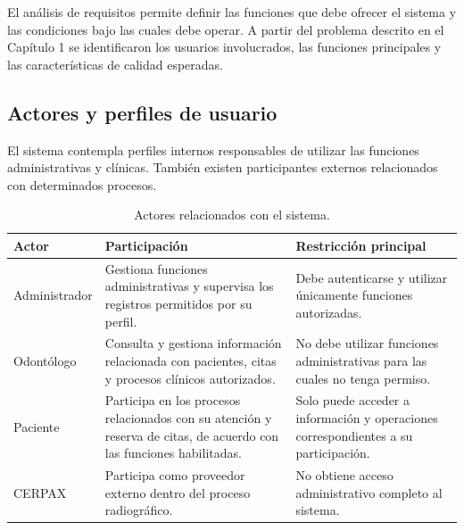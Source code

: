 El análisis de requisitos permite definir las funciones que debe ofrecer el
sistema y las condiciones bajo las cuales debe operar. A partir del problema
descrito en el Capítulo 1 se identificaron los usuarios involucrados, las
funciones principales y las características de calidad esperadas.



\subsection{Actores y perfiles de usuario}

El sistema contempla perfiles internos responsables de utilizar las
funciones administrativas y clínicas. También existen participantes externos
relacionados con determinados procesos.

\begin{table}[H]
	
	\centering
	\small
	
	\begin{tabularx}{\textwidth}
		{|L{2.5cm}|Y|Y|}
		
		\hline
		
		\textbf{Actor} &
		\textbf{Participación} &
		\textbf{Restricción principal}
		\\ \hline
		
		Administrador &
		Gestiona funciones administrativas y supervisa los registros
		permitidos por su perfil. &
		Debe autenticarse y utilizar únicamente funciones autorizadas.
		\\ \hline
		
		Odontólogo &
		Consulta y gestiona información relacionada con pacientes,
		citas y procesos clínicos autorizados. &
		No debe utilizar funciones administrativas para las cuales no
		tenga permiso.
		\\ \hline
		
		Paciente &
		Participa en los procesos relacionados con su atención y reserva
		de citas, de acuerdo con las funciones habilitadas. &
		Solo puede acceder a información y operaciones correspondientes
		a su participación.
		\\ \hline
		
		CERPAX &
		Participa como proveedor externo dentro del proceso radiográfico. &
		No obtiene acceso administrativo completo al sistema.
		\\ \hline
		
	\end{tabularx}
	
	\caption{Actores relacionados con el sistema.
		\fuentepropia}
	
\end{table}


